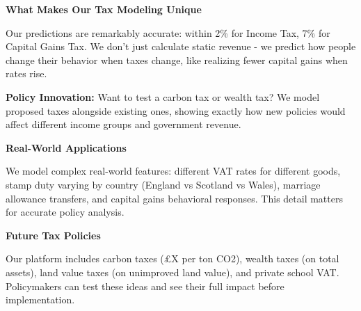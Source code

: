 \documentclass[a4paper,11pt]{article}
\newcommand{\highlightbox}[1]{%
    \begin{tcolorbox}[
        colback=lightblue,
        colframe=darkblue,
        leftrule=4mm,
        rightrule=0mm,
        toprule=0mm,
        bottomrule=0mm,
        sharp corners
    ]
    #1
    \end{tcolorbox}
}
\begin{document}
\vspace{15pt}

\textbf{What Makes Our Tax Modeling Unique}

Our predictions are remarkably accurate: within 2\% for Income Tax, 7\% for Capital Gains Tax. We don't just calculate static revenue - we predict how people change their behavior when taxes change, like realizing fewer capital gains when rates rise.

\vspace{15pt}

\highlightbox{
\textbf{Policy Innovation:} Want to test a carbon tax or wealth tax? We model proposed taxes alongside existing ones, showing exactly how new policies would affect different income groups and government revenue.
}

\vspace{15pt}

\textbf{Real-World Applications}

We model complex real-world features: different VAT rates for different goods, stamp duty varying by country (England vs Scotland vs Wales), marriage allowance transfers, and capital gains behavioral responses. This detail matters for accurate policy analysis.

\vspace{10pt}

\textbf{Future Tax Policies}

Our platform includes carbon taxes (£X per ton CO2), wealth taxes (on total assets), land value taxes (on unimproved land value), and private school VAT. Policymakers can test these ideas and see their full impact before implementation.
\end{document}
